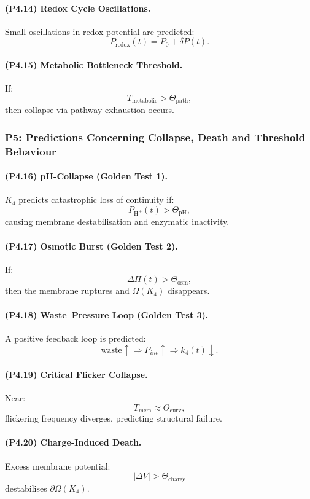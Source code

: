 \paragraph{(P4.14) Redox Cycle Oscillations.}
Small oscillations in redox potential are predicted:
\[
P_{\mathrm{redox}}(t) = P_0 + \delta P(t).
\]

\paragraph{(P4.15) Metabolic Bottleneck Threshold.}
If:
\[
T_{\mathrm{metabolic}} > \Theta_{\mathrm{path}},
\]
then collapse via pathway exhaustion occurs.

\subsubsection{P5: Predictions Concerning Collapse, Death and Threshold Behaviour}

\paragraph{(P4.16) pH-Collapse (Golden Test 1).}
$K_4$ predicts catastrophic loss of continuity if:
\[
P_{\mathrm{H}^+}(t) > \Theta_{\mathrm{pH}},
\]
causing membrane destabilisation and enzymatic inactivity.

\paragraph{(P4.17) Osmotic Burst (Golden Test 2).}
If:
\[
\Delta \Pi(t) > \Theta_{\mathrm{osm}},
\]
then the membrane ruptures and $\Omega(K_4)$ disappears.

\paragraph{(P4.18) Waste–Pressure Loop (Golden Test 3).}
A positive feedback loop is predicted:
\[
\text{waste} \uparrow \Rightarrow P_{int} \uparrow 
\Rightarrow k_4(t) \downarrow.
\]

\paragraph{(P4.19) Critical Flicker Collapse.}
Near:
\[
T_{\mathrm{mem}} \approx \Theta_{\mathrm{curv}},
\]
flickering frequency diverges, predicting structural failure.

\paragraph{(P4.20) Charge-Induced Death.}
Excess membrane potential:
\[
|\Delta V| > \Theta_{\mathrm{charge}}
\]
destabilises $\partial\Omega(K_4)$.

